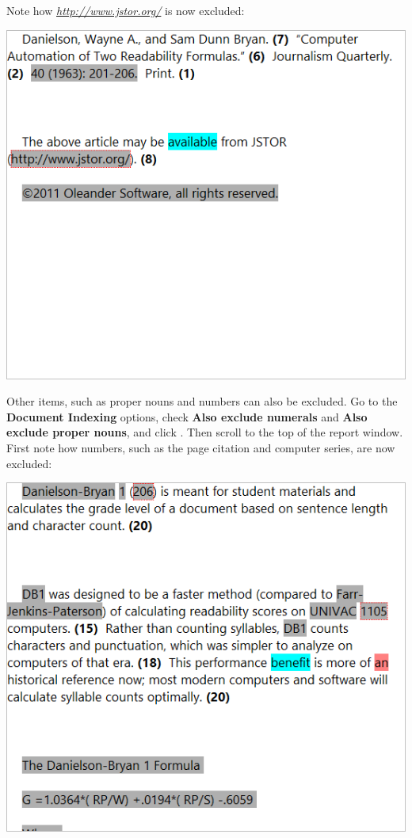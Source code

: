 \documentclass[
]{book}
\theoremstyle{definition}
\theoremstyle{definition}
\theoremstyle{definition}
\theoremstyle{definition}
\theoremstyle{remark}
\begin{document}
Note how \emph{\url{http://www.jstor.org/}} is now excluded:

\includegraphics{Images/ExclusionExampleUrlExcludedNow.png}

Other items, such as proper nouns and numbers can also be excluded. Go to the \textbf{Document Indexing} options, check \textbf{Also exclude numerals} and \textbf{Also exclude proper nouns}, and click . Then scroll to the top of the report window. First note how numbers, such as the page citation and computer series, are now excluded:

\includegraphics{Images/ExclusionExampleNumbersExcludedNow.png}
\end{document}
